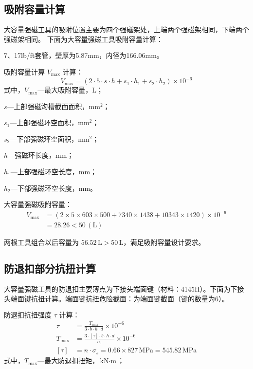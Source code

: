 \subsection{吸附容量计算}

大容量强磁工具的吸附位置主要为四个强磁架处，上端两个强磁架相同，下端两个强磁架相同。
下面为大容量强磁工具吸附容量计算：

7\inch、17lb/ft套管，壁厚为5.87mm，内径为166.06mm。

吸附容量计算 $V_{\max}$ 计算：
\begin{equation}
    V_{\max} = (2 \cdot 5 \cdot s \cdot h + s_1 \cdot h_1 + s_2 \cdot h_2) \times 10^{-6}
\end{equation}
式中，$V_{\max}$---最大吸附容量，L；

$s$---上部强磁沟槽截面面积，$\text{mm}^2$；

$s_1$---上部强磁环空面积，$\text{mm}^2$；

$s_2$---下部强磁环空面积，$\text{mm}^2$；

$h$---强磁环长度，mm；

$h_1$---上部强磁环空长度，mm；

$h_2$---下部强磁环空长度，mm。

大容量强磁吸附容量：
\begin{equation}
	\begin{aligned}
    V_{\max} &= (2 \times 5 \times 603 \times 500 + 7340 \times 1438 + 10343 \times 1420) \times 10^{-6} \\
             &= 28.26< 50\,(\text{L})
	\end{aligned}
\end{equation}

两根工具组合以后容量为 $56.52\,\text{L} > 50\,\text{L}$，满足吸附容量设计要求。


\subsection{防退扣部分抗扭计算}
大容量强磁工具的防退扣主要薄点为下接头端面键（材料：4145H）。下面为下接头端面键抗扭计算。端面键抗扭危险截面：为端面键截面（键的数量为6）。

防退扣抗扭强度 $\tau$ 计算：
\begin{align}
    \tau &= \frac{T_{\max}}{3 \cdot b \cdot h \cdot d} \times 10^{-6} \\
    T_{\max} &= \frac{3 \cdot [\tau] \cdot b \cdot h \cdot d}{n_1} \times 10^{-6} \\
    [\tau] &= n \cdot \sigma_s = 0.66 \times 827\,\text{MPa} = 545.82\,\text{MPa}
\end{align}
式中，$T_{\max}$---最大防退扣扭矩，$\text{kN}\cdot\text{m}$；

